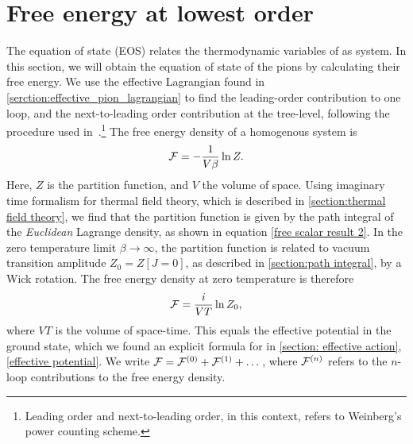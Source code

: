 \section{Free energy at lowest order}
\label{section: free energy at lowest order}

The equation of state (EOS) relates the thermodynamic variables of as system.
In this section, we will obtain the equation of state of the pions by calculating their free energy.
We use the effective Lagrangian found in \autoref{serction:effective_pion_lagrangian} to find the leading-order contribution to one loop, and the next-to-leading order contribution at the tree-level, following the procedure used in~\cite{mojahed, Andersen:two-flavor-chpt}.\footnote{Leading order and next-to-leading order, in this context, refers to Weinberg's power counting scheme.}
The free energy density of a homogenous system is
\begin{equation}
    \mathcal{F} = - \frac{1}{V \beta} \ln Z.
\end{equation}
Here, $Z$ is the partition function, and $V$ the volume of space.
Using imaginary time formalism for thermal field theory, which is described in \autoref{section:thermal field theory}, we find that the partition function is given by the path integral of the \emph{Euclidean} Lagrange density, as shown in equation \cref{free scalar result 2}.
In the zero temperature limit $\beta \rightarrow \infty$, the partition function is related to vacuum transition amplitude $Z_0 = Z[J=0]$, as described in \autoref{section:path integral}, by a Wick rotation.
The free energy density at zero temperature is therefore 
\begin{equation}
    \mathcal{F} = \frac{i}{VT} \ln Z_0,
\end{equation}
where $VT$ is the volume of space-time.
This equals the effective potential in the ground state, which we found an explicit formula for in \autoref{section: effective action}, \cref{effective potential}.
We write $\mathcal{F} = \mathcal{F}^{(0)} + \mathcal{F}^{(1)} + \dots$, where $\mathcal{F}^{(n)}$ refers to the $n$-loop contributions to the free energy density.

